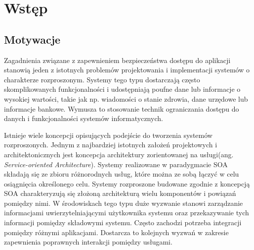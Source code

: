 \chapter{Wstęp}
\label{cha:wstep}


\section{Motywacje}
\label{sec:motywacje}

Zagadnienia związane z zapewnieniem bezpieczeństwa dostępu do aplikacji stanowią jeden z istotnych problemów projektowania i implementacji systemów o charakterze rozproszonym. Systemy tego typu dostarczają często skomplikowanych funkcjonalności i udostępniają poufne dane lub informacje o wysokiej wartości, takie jak np. wiadomości o stanie zdrowia, dane urzędowe lub informacje bankowe. Wymusza to stosowanie technik ograniczania dostępu do danych i funkcjonalności systemów informatycznych.

Istnieje wiele koncepcji opisujących podejście do tworzenia systemów rozproszonych. Jednym z najbardziej istotnych założeń projektowych i architektonicznych jest koncepcja architektury zorientowanej na usługi(ang. \textit{Service-oriented Architecture}). Systemy realizowane w paradygmacie SOA składają się ze zbioru różnorodnych usług, które można ze sobą łączyć w celu osiągnięcia określonego celu. Systemy rozproszone budowane zgodnie z koncepcją SOA charakteryzują się złożoną architekturą wielu komponentów i powiązań pomiędzy nimi. W środowiskach tego typu duże wyzwanie stanowi zarządzanie informacjami uwierzytelniającymi użytkownika systemu oraz przekazywanie tych informacji pomiędzy składowymi systemu. Często zachodzi potrzeba integracji pomiędzy różnymi aplikacjami. Dostarcza to kolejnych wyzwań w zakresie zapewnienia poprawnych interakcji pomiędzy usługami.

